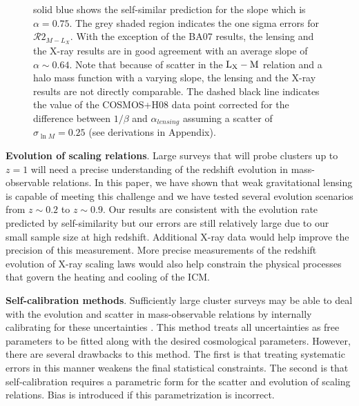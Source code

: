 \documentclass[12pt]{emulateapj}
\newcommand{\lxm}{$\rm{L}_{\rm X} - \rm{M}$ }
\begin{document}
\begin{figure}[htb]
{  solid blue shows the self-similar prediction for the slope which is
  $\alpha=0.75$. The grey shaded region indicates the one sigma errors
  for $\mathcal{R}2_{M-L_{X}}$. With the exception of the BA07
  results, the lensing and the X-ray results are in good agreement
  with an average slope of $\alpha \sim 0.64$. Note that because of
  scatter in the \lxm relation and a halo mass function with a varying
  slope, the lensing and the X-ray results are not directly
  comparable. The dashed black line indicates the value of the
  COSMOS+H08 data point corrected for the difference between $1/\beta$
  and $\alpha_{lensing}$ assuming a scatter of $\sigma_{\ln M}=0.25$
  (see derivations in Appendix). \hspace{2cm}}
\label{comp_slope}
\end{figure}

\vspace{0.05 in}

{\bf Evolution of scaling relations}. Large surveys that will probe
clusters up to $z=1$ will need a precise understanding of the redshift
evolution in mass-observable relations. In this paper, we have shown
that weak gravitational lensing is capable of meeting this challenge
and we have tested several evolution scenarios from $z\sim 0.2$ to
$z\sim 0.9$. Our results are consistent with the evolution rate
predicted by self-similarity but our errors are still relatively large
due to our small sample size at high redshift. Additional X-ray data
would help improve the precision of this measurement. More precise
measurements of the redshift evolution of X-ray scaling laws would
also help constrain the physical processes that govern the heating and
cooling of the ICM. \vspace{0.05 in}

{\bf Self-calibration methods}. Sufficiently large cluster surveys may
be able to deal with the evolution and scatter in mass-observable
relations by internally calibrating for these uncertainties \citep[the
so called ``self-calibration
method'',][]{Levine:2002,Hu:2003a,Majumdar:2004,Wang:2004b,Lima:2005}. This
method treats all uncertainties as free parameters to be fitted along
with the desired cosmological parameters. However, there are several
drawbacks to this method. The first is that treating systematic errors
in this manner weakens the final statistical constraints. The second
is that self-calibration requires a parametric form for the scatter
and evolution of scaling relations. Bias is introduced if this
parametrization is incorrect.
\end{document}
